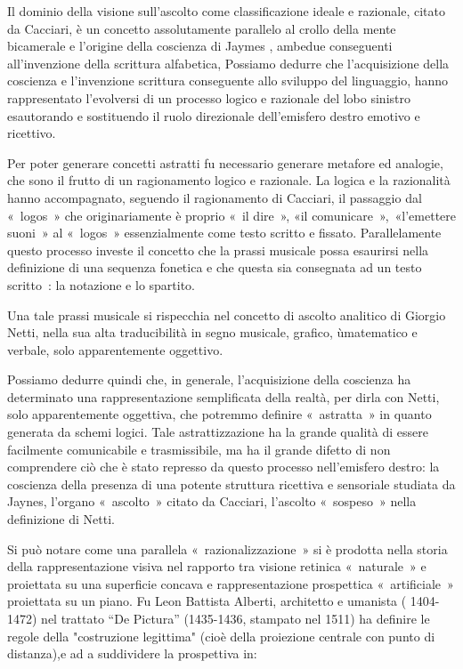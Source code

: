 Il dominio della visione sull’ascolto come classificazione ideale e razionale,
citato da Cacciari, è un concetto assolutamente parallelo  al crollo della mente
bicamerale e l’origine della coscienza  di Jaymes , ambedue conseguenti
all’invenzione della scrittura alfabetica, Possiamo dedurre che l’acquisizione
della coscienza e  l’invenzione  scrittura conseguente allo sviluppo del
linguaggio, hanno  rappresentato l’evolversi   di un processo logico e razionale
del lobo sinistro esautorando e sostituendo  il ruolo direzionale dell’emisfero
destro emotivo e ricettivo.

Per poter generare concetti astratti fu necessario  generare metafore ed
analogie, che sono il frutto di un ragionamento logico e razionale. La logica e
la razionalità hanno accompagnato, seguendo il ragionamento di Cacciari, il
passaggio dal « logos » che originariamente è proprio « il dire »,
«il comunicare », «l’emettere suoni » al « logos » essenzialmente come testo
scritto e fissato. Parallelamente questo processo investe il concetto che la
prassi musicale  possa esaurirsi nella definizione di una sequenza fonetica e
che questa sia consegnata ad un testo scritto : la notazione e lo spartito.

Una tale prassi musicale  si rispecchia nel concetto di ascolto analitico di
Giorgio Netti, nella sua alta traducibilità in segno musicale, grafico,
ùmatematico e verbale, solo apparentemente oggettivo.

Possiamo dedurre quindi che, in generale,  l’acquisizione della coscienza ha
determinato una rappresentazione semplificata della realtà, per dirla con Netti,
solo apparentemente oggettiva, che potremmo definire « astratta » in quanto
generata da schemi logici. Tale astrattizzazione  ha la grande qualità di essere
facilmente comunicabile e trasmissibile,  ma ha il grande difetto di non
comprendere ciò che è stato represso  da questo processo nell’emisfero  destro:
la coscienza della presenza   di una potente struttura ricettiva e  sensoriale
studiata da Jaynes, l’organo « ascolto » citato da  Cacciari, l’ascolto « sospeso »
nella definizione di Netti.

Si può notare come una parallela « razionalizzazione »  si è prodotta nella
storia della rappresentazione visiva  nel rapporto tra visione retinica
« naturale » e proiettata su una superficie concava e rappresentazione
prospettica « artificiale » proiettata su un piano. Fu Leon Battista Alberti,
architetto e umanista ( 1404-1472) nel trattato “De Pictura” (1435-1436,
stampato nel 1511) ha definire  le regole della "costruzione legittima"
(cioè della proiezione centrale con punto di distanza),e ad a suddividere la
prospettiva in:

